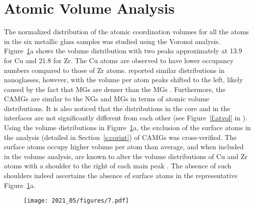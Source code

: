 \section{Atomic Volume Analysis}
\begin{selfcite}
The normalized distribution of the atomic coordination volumes for all the atoms in the six metallic glass samples was studied using the Voronoi analysis. Figure~\ref{f:vol_camg}a shows the volume distribution with two peaks approximately at 13.9 \acu for Cu and 21.8 \acu for Zr. The Cu atoms are observed to have lower occupancy numbers compared to those of Zr atoms. \textcite{Cheng2019} reported similar distributions in \czsix nanoglasses, however, with the volume per atom peaks shifted to the left, likely caused by the fact that \czsix MGs are denser than the \cz MGs \cite{Li2008}. Furthermore, the CAMGs are similar to the NGs and MGs in terms of atomic volume distributions. It is also noticed that the distributions in the core and in the interfaces are not significantly different from each other (see Figure~\ref{f:atvol} in ). Using the volume distributions in Figure~\ref{f:vol_camg}a, the exclusion of the surface atoms in the analysis (detailed in Section~\ref{s:corint}) of CAMGs was cross-verified. The surface atoms occupy higher volume per atom than average, and when included in the volume analysis, are known to alter the volume distributions of Cu and Zr atoms with a shoulder to the right of each main peak \cite{Cheng2019}. The absence of such shoulders indeed ascertains the absence of surface atoms in the representative Figure~\ref{f:vol_camg}a. \par

\begin{figure}[!h] \centering
	\texttt{[image: 2021\_05/figures/7.pdf]}
	\label{f:vol_camg}
\end{figure}



\end{selfcite}
